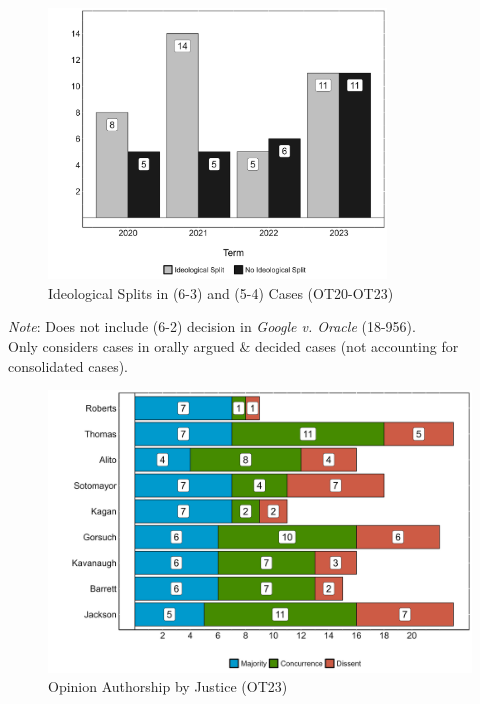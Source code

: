 \newpage

\begin{landscape}
\begin{figure}[H]
\centering
\caption{Ideological Splits in (6-3) and (5-4) Cases (OT20-OT23)}
\vspace{2.5mm}
\includegraphics[width = 0.8\textwidth]{Figures/statpack_figures/ideological_splits_OT20_OT23.png}
\end{figure}
\vspace{2.5mm}
\centering
\footnotesize{\emph{Note}: Does not include (6-2) decision in \emph{Google v. Oracle} (18-956). \\
Only considers cases in orally argued \& decided cases (not accounting for consolidated cases). }
\end{landscape}


\begin{landscape}
\begin{figure}[H]
\centering
\caption{Opinion Authorship by Justice (OT23)}
\vspace{2.5mm}
\includegraphics[width = \textwidth]{Figures/statpack_figures/opinions_by_justice_OT23.png}
\end{figure}
\end{landscape}
